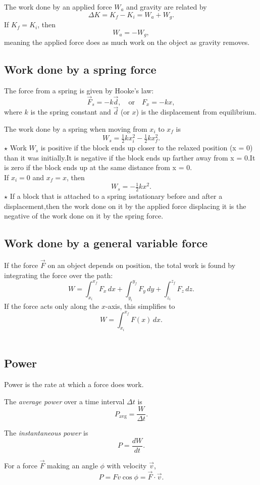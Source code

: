 The work done by an applied force $W_a$ and gravity are related by
\[
\Delta K = K_f - K_i = W_a + W_g.
\]
If $K_f = K_i$, then
\[
W_a = -W_g,
\]
meaning the applied force does as much work on the object as gravity removes.

\subsection{Work done by a spring force}

The force from a spring is given by Hooke's law:
\[
\vec{F}_s = -k\vec{d}, \quad \text{or} \quad F_x = -kx,
\]
where $k$ is the spring constant and $\vec{d}$ (or $x$) is the displacement from equilibrium.

The work done by a spring when moving from $x_i$ to $x_f$ is
\[
W_s = \tfrac{1}{2}k x_i^2 - \tfrac{1}{2}k x_f^2.
\]
$\star$ Work $W_s$
is positive if the block ends up closer to the relaxed position (x = 0) than
it was initially.It is negative if the block ends up farther away from x = 0.It is zero
if the block ends up at the same distance from x = 0.\\

If $x_i = 0$ and $x_f = x$, then
\[
W_s = -\tfrac{1}{2}kx^2.
\]
$\star$ If a block that is attached to a spring isstationary before and after a displacement,then the work done on it by the applied force displacing it is the negative
of the work done on it by the spring force. \\

\subsection{Work done by a general variable force}

If the force $\vec{F}$ on an object depends on position, the total work is found by integrating the force over the path:
\[
W = \int_{x_i}^{x_f} F_x\,dx + \int_{y_i}^{y_f} F_y\,dy + \int_{z_i}^{z_f} F_z\,dz.
\]
If the force acts only along the $x$-axis, this simplifies to
\[
W = \int_{x_i}^{x_f} F(x)\,dx.
\]
\\
\subsection{Power}

Power is the rate at which a force does work.

The \textit{average power} over a time interval $\Delta t$ is
\[
P_{\text{avg}} = \frac{W}{\Delta t}.
\]

The \textit{instantaneous power} is
\[
P = \frac{dW}{dt}.
\]

For a force $\vec{F}$ making an angle $\phi$ with velocity $\vec{v}$,
\[
P = Fv \cos \phi = \vec{F} \cdot \vec{v}.
\]

